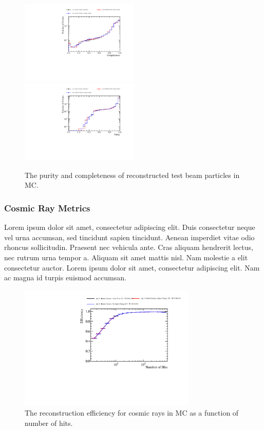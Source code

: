 \begin{figure}
\includegraphics[width=0.5\textwidth]{Figures/Metrics/MC/Beam/BeamParticleCompleteness.pdf}
\includegraphics[width=0.5\textwidth]{Figures/Metrics/MC/Beam/BeamParticlePurity.pdf}
\caption{The purity and completeness of reconstructed test beam particles in MC.}
\label{fig:2}
\end{figure}

\subsubsection{Cosmic Ray Metrics}

Lorem ipsum dolor sit amet, consectetur adipiscing elit. Duis consectetur neque vel urna accumsan, sed tincidunt sapien tincidunt. Aenean imperdiet vitae odio rhoncus sollicitudin. Praesent nec vehicula ante. Cras aliquam hendrerit lectus, nec rutrum urna tempor a. Aliquam sit amet mattis nisl. Nam molestie a elit consectetur auctor. Lorem ipsum dolor sit amet, consectetur adipiscing elit. Nam ac magna id turpis euismod accumsan.

\begin{figure}
\includegraphics[width=0.75\textwidth]{Figures/Metrics/MC/Cosmics/CosmicRayEfficiencyVsNHits.pdf}
\caption{The reconstruction efficiency for cosmic rays in MC as a function of number of hits.}
\label{fig:3}
\end{figure}

